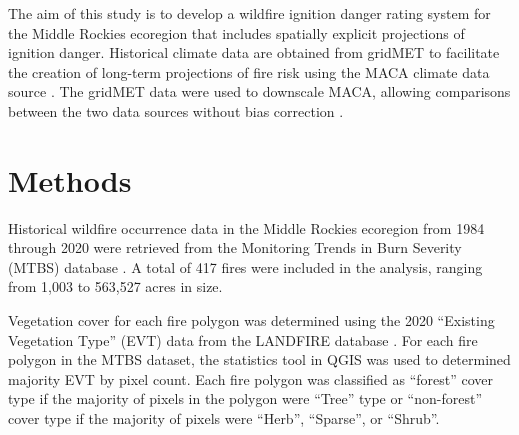 \documentclass[11pt]{article}
\begin{document}
The aim of this study is to develop a wildfire ignition danger rating system for the Middle Rockies ecoregion that includes spatially explicit projections of ignition danger. Historical climate data are obtained from gridMET to facilitate the creation of long-term projections of fire risk using the MACA climate data source \citep{abatzoglouComparisonStatisticalDownscaling2012}.  The gridMET data were used to downscale MACA, allowing comparisons between the two data sources without bias correction \citep{tercekRobustProjectionsConsequences2023}.



\section{Methods}

Historical wildfire occurrence data in the Middle Rockies ecoregion \citep{omernikEcoregionsConterminousUnited1987} from 1984 through 2020 were retrieved from the Monitoring Trends in Burn Severity (MTBS) database \citep{eidenshinkProjectMonitoringTrends2007}.  A total of 417 fires were included in the analysis, ranging from 1,003 to 563,527 acres in size.  

Vegetation cover for each fire polygon was determined using the 2020 ``Existing Vegetation Type'' (EVT) data from the LANDFIRE database \citep{rollinsLANDFIRENationallyConsistent2009}.  For each fire polygon in the MTBS dataset, the statistics tool in QGIS was used to determined majority EVT by pixel count.  Each fire polygon was classified as ``forest'' cover type if the majority of pixels in the polygon were ``Tree'' type or ``non-forest'' cover type if the majority of pixels were ``Herb'', ``Sparse'', or ``Shrub''.  

\end{document}
